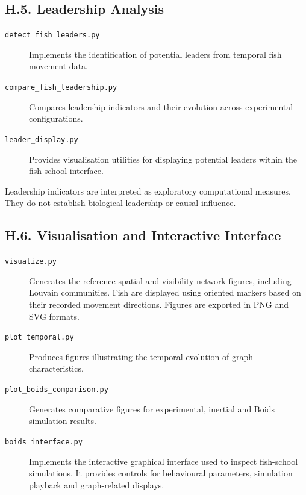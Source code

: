 \documentclass[10pt,a4paper]{article}
\begin{document}
\subsection*{H.5. Leadership Analysis}

\begin{description}

\item[\texttt{detect\_fish\_leaders.py}]
Implements the identification of potential
leaders from temporal fish movement data.

\item[\texttt{compare\_fish\_leadership.py}]
Compares leadership indicators and their
evolution across experimental configurations.

\item[\texttt{leader\_display.py}]
Provides visualisation utilities for displaying
potential leaders within the fish-school interface.

\end{description}

Leadership indicators are interpreted as exploratory
computational measures. They do not establish
biological leadership or causal influence.

\subsection*{H.6. Visualisation and Interactive Interface}

\begin{description}

\item[\texttt{visualize.py}]
Generates the reference spatial and visibility
network figures, including Louvain communities.
Fish are displayed using oriented markers based
on their recorded movement directions.
Figures are exported in PNG and SVG formats.

\item[\texttt{plot\_temporal.py}]
Produces figures illustrating the temporal
evolution of graph characteristics.

\item[\texttt{plot\_boids\_comparison.py}]
Generates comparative figures for experimental,
inertial and Boids simulation results.

\item[\texttt{boids\_interface.py}]
Implements the interactive graphical interface
used to inspect fish-school simulations.
It provides controls for behavioural parameters,
simulation playback and graph-related displays.

\end{description}
\end{document}
